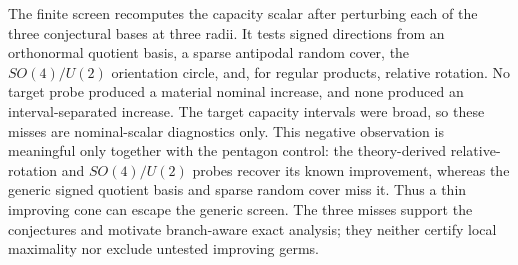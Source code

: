 The finite screen recomputes the capacity scalar after perturbing each of the
three conjectural bases at three radii.  It tests signed directions from an
orthonormal quotient basis, a sparse antipodal random cover, the
\(SO(4)/U(2)\) orientation circle, and, for regular products, relative
rotation.  No target probe produced a material nominal increase, and none
produced an interval-separated increase.  The target capacity intervals were
broad, so these misses are nominal-scalar diagnostics only.  This negative
observation is meaningful only together with the pentagon control:
the theory-derived relative-rotation and \(SO(4)/U(2)\) probes recover its
known improvement, whereas the generic signed quotient basis and sparse
random cover miss it.  Thus a thin improving cone can escape the generic
screen.  The three misses support the conjectures and motivate branch-aware
exact analysis; they neither certify local maximality nor exclude untested
improving germs.
